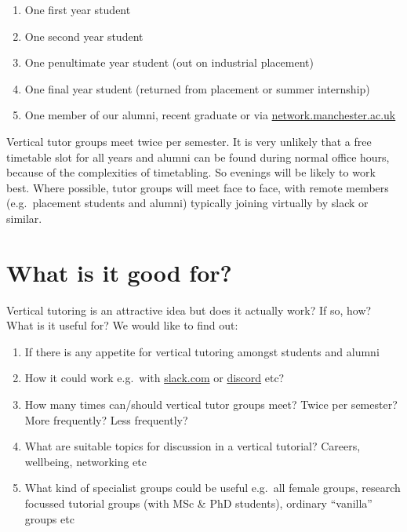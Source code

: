 \documentclass[12pt,]{book}
\providecommand{\tightlist}{%
  \setlength{\itemsep}{0pt}\setlength{\parskip}{0pt}}
\begin{document}
\begin{enumerate}
\def\labelenumi{\arabic{enumi}.}
\tightlist
\item
  One first year student
\item
  One second year student
\item
  One penultimate year student (out on industrial placement)
\item
  One final year student (returned from placement or summer internship)
\item
  One member of our alumni, recent graduate or via \href{https://www.network.manchester.ac.uk/}{network.manchester.ac.uk}
\end{enumerate}

Vertical tutor groups meet twice per semester. It is very unlikely that a free timetable slot for all years and alumni can be found during normal office hours, because of the complexities of timetabling. So evenings will be likely to work best. Where possible, tutor groups will meet face to face, with remote members (e.g.~placement students and alumni) typically joining virtually by slack or similar.

\hypertarget{what-is-it-good-for}{%
\section{What is it good for?}\label{what-is-it-good-for}}

Vertical tutoring is an attractive idea but does it actually work? If so, how? What is it useful for? We would like to find out:

\begin{enumerate}
\def\labelenumi{\arabic{enumi}.}
\tightlist
\item
  If there is any appetite for vertical tutoring amongst students and alumni
\item
  How it could work e.g.~with \href{https://slack.com}{slack.com} or \href{https://discordapp.com/}{discord} etc?
\item
  How many times can/should vertical tutor groups meet? Twice per semester? More frequently? Less frequently?
\item
  What are suitable topics for discussion in a vertical tutorial? Careers, wellbeing, networking etc
\item
  What kind of specialist groups could be useful e.g.~all female groups, research focussed tutorial groups (with MSc \& PhD students), ordinary ``vanilla'' groups etc
\end{enumerate}
\end{document}
